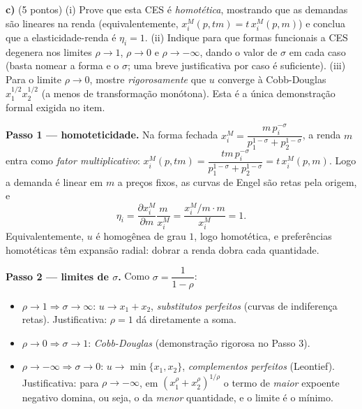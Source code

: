 \textbf{c)} (5 pontos) (i) Prove que esta CES é \emph{homotética}, mostrando que as demandas são lineares na renda (equivalentemente, $x_i^{M}(p,tm)=t\,x_i^{M}(p,m)$) e conclua que a elasticidade-renda é $\eta_i=1$. (ii) Indique para que formas funcionais a CES degenera nos limites $\rho\to 1$, $\rho\to 0$ e $\rho\to -\infty$, dando o valor de $\sigma$ em cada caso (basta nomear a forma e o $\sigma$; uma breve justificativa por caso é suficiente). (iii) Para o limite $\rho\to 0$, mostre \emph{rigorosamente} que $u$ converge à Cobb-Douglas $x_1^{1/2}x_2^{1/2}$ (a menos de transformação monótona). Esta é a única demonstração formal exigida no item.
\resolucaobox{5.5cm}
\begin{solucao}
\textbf{Passo 1 --- homoteticidade.} Na forma fechada $x_i^{M}=\dfrac{m\,p_i^{-\sigma}}{p_1^{1-\sigma}+p_2^{1-\sigma}}$, a renda $m$ entra como \emph{fator multiplicativo}: $x_i^{M}(p,tm)=\dfrac{tm\,p_i^{-\sigma}}{p_1^{1-\sigma}+p_2^{1-\sigma}}=t\,x_i^{M}(p,m)$. Logo a demanda é linear em $m$ a preços fixos, as curvas de Engel são retas pela origem, e
\[
\eta_i=\frac{\partial x_i^{M}}{\partial m}\frac{m}{x_i^{M}}=\frac{x_i^{M}/m\cdot m}{x_i^{M}}=1.
\]
Equivalentemente, $u$ é homogênea de grau $1$, logo homotética, e preferências homotéticas têm expansão radial: dobrar a renda dobra cada quantidade.

\textbf{Passo 2 --- limites de $\sigma$.} Como $\sigma=\dfrac{1}{1-\rho}$:
\begin{itemize}
\item $\rho\to 1\Rightarrow \sigma\to\infty$: $u\to x_1+x_2$, \emph{substitutos perfeitos} (curvas de indiferença retas). Justificativa: $\rho=1$ dá diretamente a soma.
\item $\rho\to 0\Rightarrow \sigma\to 1$: \emph{Cobb-Douglas} (demonstração rigorosa no Passo 3).
\item $\rho\to -\infty\Rightarrow \sigma\to 0$: $u\to\min\{x_1,x_2\}$, \emph{complementos perfeitos} (Leontief). Justificativa: para $\rho\to-\infty$, em $(x_1^{\rho}+x_2^{\rho})^{1/\rho}$ o termo de \emph{maior} expoente negativo domina, ou seja, o da \emph{menor} quantidade, e o limite é o mínimo.
\end{itemize}


\end{solucao}
